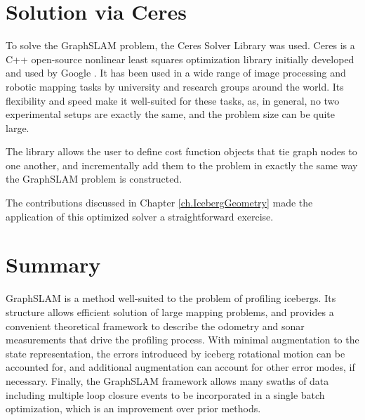 \section{Solution via Ceres}

To solve the GraphSLAM problem, the Ceres Solver Library was used. Ceres is a C++ open-source nonlinear least squares optimization library initially developed and used by Google \cite{ceres-solver}. It has been used in a wide range of image processing and robotic mapping tasks by university and research groups around the world. Its flexibility and speed make it well-suited for these tasks, as, in general, no two experimental setups are exactly the same, and the problem size can be quite large.  

The library allows the user to define cost function objects that tie graph nodes to one another, and incrementally add them to the problem in exactly the same way the GraphSLAM problem is constructed. 

The contributions discussed in Chapter \ref{ch.IcebergGeometry} made the application of this optimized solver a straightforward exercise.

\section{Summary}

GraphSLAM is a method well-suited to the problem of profiling icebergs. Its structure allows efficient solution of large mapping problems, and provides a convenient theoretical framework to describe the odometry and sonar measurements that drive the profiling process. With minimal augmentation to the state representation, the errors introduced by iceberg rotational motion can be accounted for, and additional augmentation can account for other error modes, if necessary. Finally, the GraphSLAM framework allows many swaths of data including multiple loop closure events to be incorporated in a single batch optimization, which is an improvement over prior methods.
